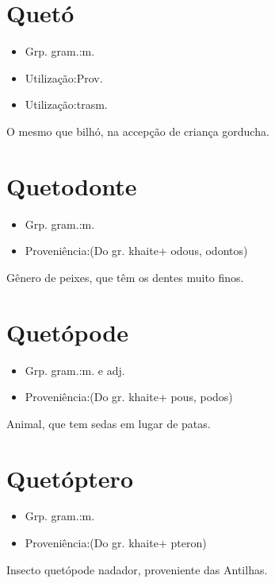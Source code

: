 \section{Quetó}
\begin{itemize}
\item {Grp. gram.:m.}
\end{itemize}
\begin{itemize}
\item {Utilização:Prov.}
\end{itemize}
\begin{itemize}
\item {Utilização:trasm.}
\end{itemize}
O mesmo que \textunderscore bilhó\textunderscore , na accepção de criança gorducha.
\section{Quetodonte}
\begin{itemize}
\item {Grp. gram.:m.}
\end{itemize}
\begin{itemize}
\item {Proveniência:(Do gr. \textunderscore khaite\textunderscore  + \textunderscore odous\textunderscore , \textunderscore odontos\textunderscore )}
\end{itemize}
Gênero de peixes, que têm os dentes muito finos.
\section{Quetópode}
\begin{itemize}
\item {Grp. gram.:m.  e  adj.}
\end{itemize}
\begin{itemize}
\item {Proveniência:(Do gr. \textunderscore khaite\textunderscore  + \textunderscore pous\textunderscore , \textunderscore podos\textunderscore )}
\end{itemize}
Animal, que tem sedas em lugar de patas.
\section{Quetóptero}
\begin{itemize}
\item {Grp. gram.:m.}
\end{itemize}
\begin{itemize}
\item {Proveniência:(Do gr. \textunderscore khaite\textunderscore  + \textunderscore pteron\textunderscore )}
\end{itemize}
Insecto quetópode nadador, proveniente das Antilhas.
